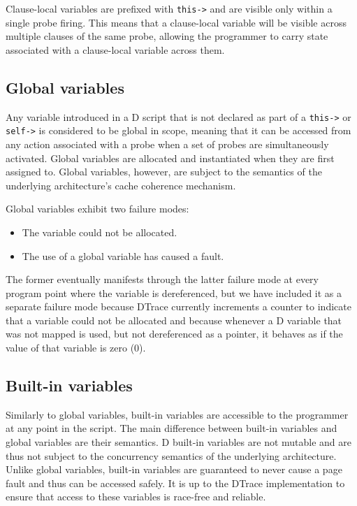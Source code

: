Clause-local variables are prefixed with \texttt{this->} and are visible only
within a single probe firing. This means that a clause-local variable will be
visible across multiple clauses of the same probe, allowing the programmer to
carry state associated with a clause-local variable across them.

\subsection{Global variables}
\label{subsec:global-variables}

Any variable introduced in a D script that is not declared as part of a
\verb|this->| or \verb|self->| is considered to be global in scope, meaning that
it can be accessed from any action associated with a probe when a set of probes
are simultaneously activated.  Global variables are allocated and instantiated
when they are first assigned to.  Global variables, however, are subject to the
semantics of the underlying architecture's cache coherence mechanism.

Global variables exhibit two failure modes:
\begin{itemize}
\item The variable could not be allocated.
\item The use of a global variable has caused a fault.
\end{itemize}
The former eventually manifests through the latter failure mode at
every program point where the variable is dereferenced, but we have
included it as a separate failure mode because DTrace currently
increments a counter to indicate that a variable could not
be allocated and because whenever a D variable that was not mapped is
used, but not dereferenced as a pointer, it behaves as if the value of
that variable is zero (0).

\subsection{Built-in variables}
\label{subsec:builtin-variables}

Similarly to global variables, built-in variables are accessible to
the programmer at any point in the script. The main difference between
built-in variables and global variables are their semantics. D
built-in variables are not mutable and are thus not subject to the
concurrency semantics of the underlying architecture. Unlike global
variables, built-in variables are guaranteed to never cause a page
fault and thus can be accessed safely. It is up to the DTrace
implementation to ensure that access to these variables is
race-free and reliable.

